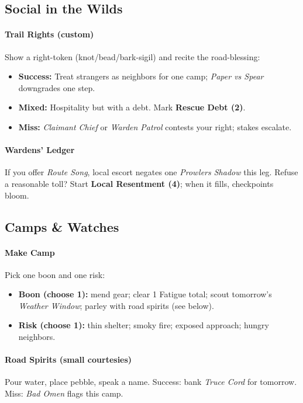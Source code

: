 \subsection*{Social in the Wilds}

\paragraph{Trail Rights (custom)}
Show a right-token (knot/bead/bark-sigil) and recite the road-blessing:
\begin{itemize}
\item \textbf{Success:} Treat strangers as neighbors for one camp; \emph{Paper vs Spear} downgrades one step.
\item \textbf{Mixed:} Hospitality but with a debt. Mark \textbf{Rescue Debt (2)}.
\item \textbf{Miss:} \emph{Claimant Chief} or \emph{Warden Patrol} contests your right; stakes escalate.
\end{itemize}

\paragraph{Wardens’ Ledger}
If you offer \emph{Route Song}, local escort negates one \emph{Prowlers Shadow} this leg. Refuse a reasonable toll? Start \textbf{Local Resentment (4)}; when it fills, checkpoints bloom.
\subsection*{Camps \& Watches}

\paragraph{Make Camp}
Pick one boon and one risk:
\begin{itemize}
\item \textbf{Boon (choose 1):} mend gear; clear 1 Fatigue total; scout tomorrow’s \emph{Weather Window}; parley with road spirits (see below).
\item \textbf{Risk (choose 1):} thin shelter; smoky fire; exposed approach; hungry neighbors.
\end{itemize}

\paragraph{Road Spirits (small courtesies)}
Pour water, place pebble, speak a name. Success: bank \emph{Truce Cord} for tomorrow. Miss: \emph{Bad Omen} flags this camp.
